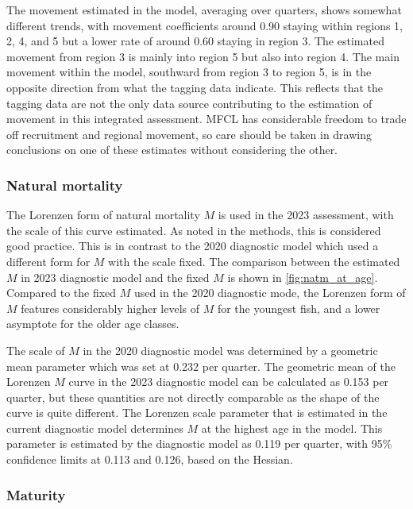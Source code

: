 The movement estimated in the model, averaging over quarters, shows somewhat different trends, with movement coefficients around 0.90 staying within regions 1, 2, 4, and 5 but a lower rate of around 0.60 staying in region 3. The estimated movement from region 3 is mainly into region 5 but also into region 4. The main movement within the model, southward from region 3 to region 5, is in the opposite direction from what the tagging data indicate. This reflects that the tagging data are not the only data source contributing to the estimation of movement in this integrated assessment. MFCL has considerable freedom to trade off recruitment and regional movement, so care should be taken in drawing conclusions on one of these estimates without considering the other.

\subsubsection{Natural mortality}
\label{sec:natM}

The Lorenzen form of natural mortality $M$ is used in the 2023 assessment, with the scale of this curve estimated. As noted in the methods, this is considered good practice. This is in contrast to the 2020 diagnostic model which used a different form for $M$ with the scale fixed. The comparison between the estimated $M$ in 2023 diagnostic model and the fixed $M$ is shown in \autoref{fig:natm_at_age}. Compared to the fixed $M$ used in the 2020 diagnostic mode, the Lorenzen form of $M$ features considerably higher levels of $M$ for the youngest fish, and a lower asymptote for the older age classes.

The scale of $M$ in the 2020 diagnostic model was determined by a geometric mean parameter which was set at 0.232 per quarter. The geometric mean of the Lorenzen $M$ curve in the 2023 diagnostic model can be calculated as 0.153 per quarter, but these quantities are not directly comparable as the shape of the curve is quite different. The Lorenzen scale parameter that is estimated in the current diagnostic model determines $M$ at the highest age in the model. This parameter is estimated by the diagnostic model as 0.119 per quarter, with 95\% confidence limits at 0.113 and 0.126, based on the Hessian.

\subsubsection{Maturity}
\label{sec:maturity_at_age}

